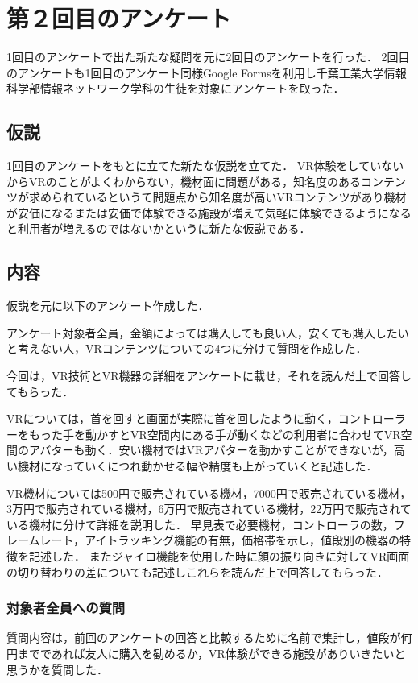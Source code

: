 \documentclass[12pt,a4j]{ltjsarticle}
\begin{document}
\clearpage

\section{第２回目のアンケート}
1回目のアンケートで出た新たな疑問を元に2回目のアンケートを行った．
2回目のアンケートも1回目のアンケート同様Google Formsを利用し千葉工業大学情報科学部情報ネットワーク学科の生徒を対象にアンケートを取った．

\subsection{仮説}
1回目のアンケートをもとに立てた新たな仮説を立てた．
VR体験をしていないからVRのことがよくわからない，機材面に問題がある，知名度のあるコンテンツが求められているというて問題点から知名度が高いVRコンテンツがあり機材が安価になるまたは安価で体験できる施設が増えて気軽に体験できるようになると利用者が増えるのではないかというに新たな仮説である．

\subsection{内容}
仮説を元に以下のアンケート作成した．

アンケート対象者全員，金額によっては購入しても良い人，安くても購入したいと考えない人，VRコンテンツについての4つに分けて質問を作成した．

今回は，VR技術とVR機器の詳細をアンケートに載せ，それを読んだ上で回答してもらった．

VRについては，首を回すと画面が実際に首を回したように動く，コントローラーをもった手を動かすとVR空間内にある手が動くなどの利用者に合わせてVR空間のアバターも動く．安い機材ではVRアバターを動かすことができないが，高い機材になっていくにつれ動かせる幅や精度も上がっていくと記述した．

VR機材については500円で販売されている機材，7000円で販売されている機材，3万円で販売されている機材，6万円で販売されている機材，22万円で販売されている機材に分けて詳細を説明した．
早見表で必要機材，コントローラの数，フレームレート，アイトラッキング機能の有無，価格帯を示し，値段別の機器の特徴を記述した．
またジャイロ機能を使用した時に顔の振り向きに対してVR画面の切り替わりの差についても記述しこれらを読んだ上で回答してもらった．

\subsubsection{対象者全員への質問}
質問内容は，前回のアンケートの回答と比較するために名前で集計し，値段が何円までであれば友人に購入を勧めるか，VR体験ができる施設がありいきたいと思うかを質問した．
\end{document}
